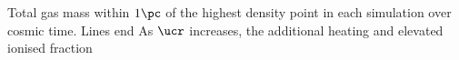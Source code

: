 \label{fig:collapse}
Total gas mass within $1\pc$ of the highest density point in each simulation over cosmic time.  Lines end 
As $\ucr$ increases, the additional heating and elevated ionised fraction 